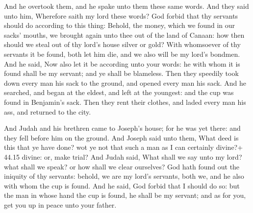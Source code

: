  And he overtook them, and he spake unto them these same
words.  And they said unto him, Wherefore saith my lord
these words? God forbid that thy servants should do according to this
thing:  Behold, the money, which we found in our sacks'
mouths, we brought again unto thee out of the land of Canaan: how then
should we steal out of thy lord's house silver or gold? 
With whomsoever of thy servants it be found, both let him die, and we
also will be my lord's bondmen.  And he said, Now also let
it be according unto your words: he with whom it is found shall be my
servant; and ye shall be blameless.  Then they speedily
took down every man his sack to the ground, and opened every man his
sack.  And he searched, and began at the eldest, and left
at the youngest: and the cup was found in Benjamin's sack. 
Then they rent their clothes, and laded every man his ass, and returned
to the city.

 And Judah and his brethren came to Joseph's house; for
he was yet there: and they fell before him on the ground. 
And Joseph said unto them, What deed is this that ye have done? wot ye
not that such a man as I can certainly divine?+ 44.15 divine: or, make
trial?  And Judah said, What shall we say unto my lord?
what shall we speak? or how shall we clear ourselves? God hath found out
the iniquity of thy servants: behold, we are my lord's servants, both
we, and he also with whom the cup is found.  And he said,
God forbid that I should do so: but the man in whose hand the cup is
found, he shall be my servant; and as for you, get you up in peace unto
your father.


